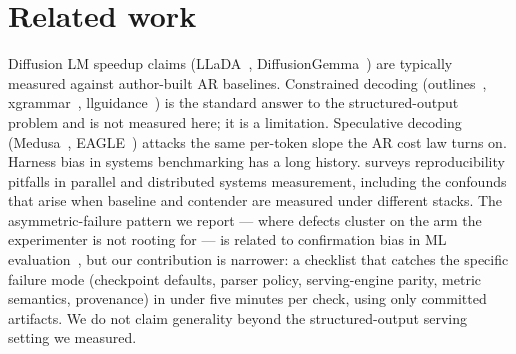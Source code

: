 \section{Related work}
\label{sec:related} Diffusion LM speedup claims (LLaDA~\cite{llada2025},
DiffusionGemma~\cite{diffusiongemma}) are typically measured against
author-built AR baselines. Constrained decoding
(outlines~\cite{outlines2024}, xgrammar~\cite{xgrammar2024},
llguidance~\cite{llguidance}) is the standard answer to the structured-output
problem and is not measured here; it is a limitation. Speculative decoding
(Medusa~\cite{medusa2024}, EAGLE~\cite{eagle2024}) attacks the same per-token
slope the AR cost law turns on. Harness bias in systems benchmarking has a long history.
\cite{hoefler2021} surveys reproducibility pitfalls in parallel and
distributed systems measurement, including the confounds that arise when
baseline and contender are measured under different stacks. The
asymmetric-failure pattern we report --- where defects cluster on the arm
the experimenter is not rooting for --- is related to confirmation bias in
ML evaluation~\cite{hoefler2021}, but our contribution is narrower: a
checklist that catches the specific failure mode (checkpoint defaults, parser
policy, serving-engine parity, metric semantics, provenance) in under five
minutes per check, using only committed artifacts. We do not claim
generality beyond the structured-output serving setting we measured.
